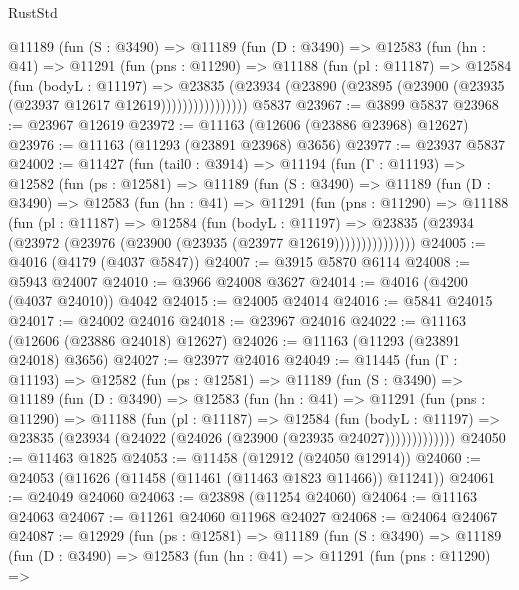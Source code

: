 \begin{lexlean}{RustStd}
\begin{coremodule}
          @11189
            (fun (S : @3490) =>
            @11189
              (fun (D : @3490) =>
              @12583
                (fun (hn : @41) =>
                @11291
                  (fun (pns : @11290) =>
                  @11188
                    (fun (pl : @11187) =>
                    @12584
                      (fun (bodyL : @11197) =>
                      @23835
                        (@23934
                          (@23890 (@23895 (@23900 (@23935 (@23937 @12617 @12619))))))))))))))))
    @5837
@23967 := @3899 @5837
@23968 := @23967 @12619
@23972 := @11163 (@12606 (@23886 @23968) @12627)
@23976 := @11163 (@11293 (@23891 @23968) @3656)
@23977 := @23937 @5837
@24002 := @11427
    (fun (tail0 : @3914) =>
    @11194
      (fun (Γ : @11193) =>
      @12582
        (fun (ps : @12581) =>
        @11189
          (fun (S : @3490) =>
          @11189
            (fun (D : @3490) =>
            @12583
              (fun (hn : @41) =>
              @11291
                (fun (pns : @11290) =>
                @11188
                  (fun (pl : @11187) =>
                  @12584
                    (fun (bodyL : @11197) =>
                    @23835 (@23934 (@23972 (@23976 (@23900 (@23935 (@23977 @12619)))))))))))))))
@24005 := @4016 (@4179 (@4037 @5847))
@24007 := @3915 @5870 @6114
@24008 := @5943 @24007
@24010 := @3966 @24008 @3627
@24014 := @4016 (@4200 (@4037 @24010)) @4042
@24015 := @24005 @24014
@24016 := @5841 @24015
@24017 := @24002 @24016
@24018 := @23967 @24016
@24022 := @11163 (@12606 (@23886 @24018) @12627)
@24026 := @11163 (@11293 (@23891 @24018) @3656)
@24027 := @23977 @24016
@24049 := @11445
    (fun (Γ : @11193) =>
    @12582
      (fun (ps : @12581) =>
      @11189
        (fun (S : @3490) =>
        @11189
          (fun (D : @3490) =>
          @12583
            (fun (hn : @41) =>
            @11291
              (fun (pns : @11290) =>
              @11188
                (fun (pl : @11187) =>
                @12584
                  (fun (bodyL : @11197) =>
                  @23835 (@23934 (@24022 (@24026 (@23900 (@23935 @24027)))))))))))))
@24050 := @11463 @1825
@24053 := @11458 (@12912 (@24050 @12914))
@24060 := @24053 (@11626 (@11458 (@11461 (@11463 @1823 @11466)) @11241))
@24061 := @24049 @24060
@24063 := @23898 (@11254 @24060)
@24064 := @11163 @24063
@24067 := @11261 @24060 @11968 @24027
@24068 := @24064 @24067
@24087 := @12929
    (fun (ps : @12581) =>
    @11189
      (fun (S : @3490) =>
      @11189
        (fun (D : @3490) =>
        @12583
          (fun (hn : @41) =>
          @11291
            (fun (pns : @11290) =>

\end{coremodule}
\end{lexlean}
